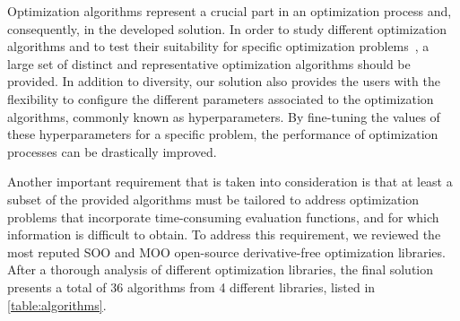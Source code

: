 Optimization algorithms represent a crucial part in an optimization process and, consequently, in the developed solution. In order to study different optimization algorithms and to test their suitability for specific optimization problems~\cite{Wolpert1997NFLT}, a large set of distinct and representative optimization algorithms should be provided. In addition to diversity, our solution also provides the users with the flexibility to configure the different parameters associated to the optimization algorithms, commonly known as hyperparameters. By fine-tuning the values of these hyperparameters for a specific problem, the performance of optimization processes can be drastically improved. 

Another important requirement that is taken into consideration is that at least a subset of the provided algorithms must be tailored to address optimization problems that incorporate time-consuming evaluation functions, and for which information is difficult to obtain. To address this requirement, we reviewed the most reputed \ac{SOO} and \ac{MOO} open-source derivative-free optimization libraries. After a thorough analysis of different optimization libraries, the final solution presents a total of 36 algorithms from 4 different libraries, listed in \cref{table:algorithms}. 

